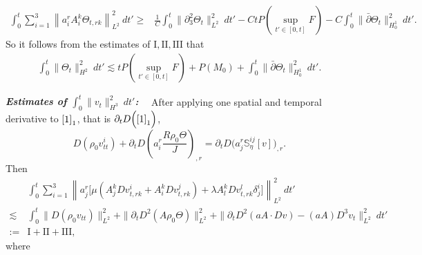 \documentclass[12pt,a4paper]{amsart}
\numberwithin{equation}{section}
\theoremstyle{plain}
\theoremstyle{definition}
\newcommand{\bpartial}{\bar{\partial}}
\begin{document}
\begin{align*}
\int_{0}^{t}\sum\limits_{i=1}^3\left\|a^r_iA^k_i\Theta_{t,rk} \right\|_{L^2}^2 \ dt'
\geq & \frac{1}{C}\int_{0}^{t}\|\partial_3^2 \Theta_t\|_{L^2}^2 \ dt'-CtP(\sup\limits_{t'\in[0,t]}F)-C\int_{0}^{t} \|\bpartial \Theta_t\|_{H_0^1}^2 \ dt'.
\end{align*}
So it follows from the estimates of $\mathrm{I},\mathrm{II},\mathrm{III}$ that
\begin{equation}\label{dthetatx}
\begin{aligned}
\int_{0}^{t}\| \Theta_t\|_{H^2}^2 \ dt'\lesssim tP(\sup\limits_{t'\in[0,t]}F)+P(M_0)+\int_{0}^{t} \|\bpartial \Theta_t\|_{H_0^1}^2 \ dt'.
\end{aligned}
\end{equation}


\vspace{0.3cm}
\textsl{\textbf{Estimates of $\int_{0}^{t}\| v_t\|_{H^3}^2\ dt'$:}}~~
After applying one spatial and temporal derivative to $\eqref{1}_1$, that is $\partial_t D \Big(\eqref{1}_1\Big)$,
$$
D(\rho_0v^i_{tt})+\partial_t D \left(a^r_i \frac{R\rho_0\Theta}{J}\right)_{,r}=\partial_t D \Big(a^r_j \mathbb{S}^{ij}_{\eta}[v]\Big)_{,r}.
$$
Then 
\begin{align*}
&\int_{0}^{t}\sum\limits_{i=1}^3\left\| a^r_j\Big[\mu (A^{k}_j  D v^i_{t,rk}+A^k_i D v^j_{t,rk})+\lambda A_l^k D v^l_{t,rk}\delta^i_j\Big]   \right\|_{L^2}^2 \ dt'\\
\lesssim & \int_{0}^{t} \|D(\rho_0 v_{tt})\|_{L^2}^2
 +\| \partial_t D^2(A\rho_0\Theta)\|_{L^2}^2
 +\|\partial_t D^2(a A \cdot Dv)- (aA) D^3v_t\|_{L^2}^2\ dt'\\
:=&\mathrm{I}+\mathrm{II}+\mathrm{III},
\end{align*}
where
\end{document}

